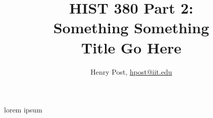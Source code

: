 \documentclass[a4paper,12pt]{article}
\title{HIST 380 Part 2: \\ Something Something \\ Title Go Here }
\author{Henry Post, \url{hpost@iit.edu}}
\begin{document}
\maketitle

\newpage

lorem ipsum

\newpage

\begin{thebibliography}{9}


\end{thebibliography}

\newpage

\end{document}
